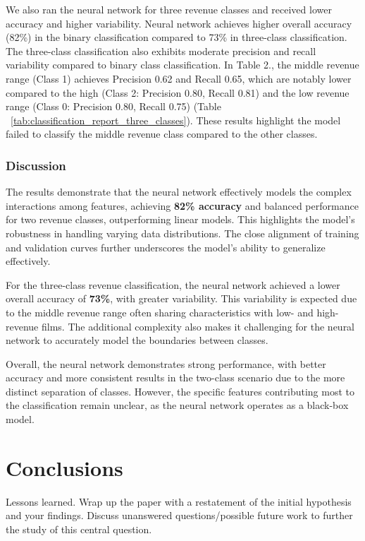 \documentclass{article}
\begin{document}
We also ran the neural network for three revenue classes and received lower accuracy and higher variability. Neural network achieves higher overall accuracy (82\%) in the binary classification compared to 73\% in three-class classification. The three-class classification also exhibits moderate precision and recall variability compared to binary class classification. In Table 2., the middle revenue range (Class 1) achieves Precision 0.62 and Recall 0.65, which are notably lower compared to the high (Class 2: Precision 0.80, Recall 0.81) and the low revenue range (Class 0: Precision 0.80, Recall 0.75) (Table ~\ref{tab:classification_report_three_classes}). These results highlight the model failed to classify the middle revenue class compared to the other classes.

\subsubsection{Discussion}

The results demonstrate that the neural network effectively models the complex interactions among features, achieving \textbf{82\% accuracy} and balanced performance for two revenue classes, outperforming linear models. This highlights the model’s robustness in handling varying data distributions. The close alignment of training and validation curves further underscores the model's ability to generalize effectively.

For the three-class revenue classification, the neural network achieved a lower overall accuracy of \textbf{73\%}, with greater variability. This variability is expected due to the middle revenue range often sharing characteristics with low- and high-revenue films. The additional complexity also makes it challenging for the neural network to accurately model the boundaries between classes.

Overall, the neural network demonstrates strong performance, with better accuracy and more consistent results in the two-class scenario due to the more distinct separation of classes. However, the specific features contributing most to the classification remain unclear, as the neural network operates as a black-box model.

\section{Conclusions}
\label{conclusion}

Lessons learned.  Wrap up the paper with a restatement of the initial hypothesis
and your findings.  Discuss unanswered questions/possible future work to further
the study of this central question.
\end{document}
